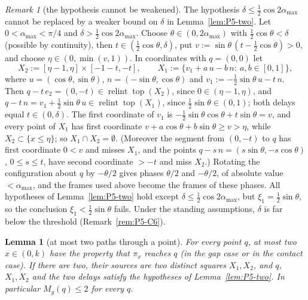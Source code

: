 \documentclass[11pt]{amsart}
\newcommand{\relint}{\operatorname{relint}}
\newcommand{\Top}{\operatorname{top}}
\newcommand{\amax}{\alpha_{\max}}
\newtheorem{lemma}[theorem]{Lemma}
\theoremstyle{definition}
\theoremstyle{remark}
\newtheorem{remark}[theorem]{Remark}
\numberwithin{equation}{section}
\begin{document}
\begin{remark}[the hypothesis cannot be weakened]\label{rem:P5-sharp}
The hypothesis $\delta\le\frac12\cos2\amax$ cannot be replaced by a weaker bound on $\delta$ in Lemma~\ref{lem:P5-two}. Let $0<\amax<\pi/4$ and $\delta>\frac12\cos2\amax$. Choose $\theta\in(0,2\amax)$ with $\frac12\cos\theta<\delta$ (possible by continuity), then $t\in(\frac12\cos\theta,\delta)$, put $v:=\sin\theta\,(t-\frac12\cos\theta)>0$, and choose $\eta\in(0,\min(v,1))$. In coordinates with $q=(0,0)$ let
\[
X_2:=[\eta-1,\eta]\times[-1-t,-t],\qquad X_1:=\{v_1+a\,u-b\,n:\ a,b\in[0,1]\},
\]
where $u=(\cos\theta,\sin\theta)$, $n=(-\sin\theta,\cos\theta)$ and $v_1:=-\frac12\sin\theta\,u-t\,n$. Then $q-t\,e_2=(0,-t)\in\relint\Top(X_2)$, since $0\in(\eta-1,\eta)$, and $q-t\,n=v_1+\frac12\sin\theta\,u\in\relint\Top(X_1)$, since $\frac12\sin\theta\in(0,1)$; both delays equal $t\in(0,\delta)$. The first coordinate of $v_1$ is $-\frac12\sin\theta\cos\theta+t\sin\theta=v$, and every point of $X_1$ has first coordinate $v+a\cos\theta+b\sin\theta\ge v>\eta$, while $X_2\subset\{x\le\eta\}$; so $X_1\cap X_2=\emptyset$. (Moreover the segment from $(0,-t)$ to $q$ has first coordinate $0<v$ and misses $X_1$, and the points $q-s\,n=(s\sin\theta,-s\cos\theta)$, $0\le s\le t$, have second coordinate $>-t$ and miss $X_2$.) Rotating the configuration about $q$ by $-\theta/2$ gives phases $\theta/2$ and $-\theta/2$, of absolute value $<\amax$, and the frames used above become the frames of these phases. All hypotheses of Lemma~\ref{lem:P5-two} hold except $\delta\le\frac12\cos2\amax$, but $\xi_1=\frac12\sin\theta$, so the conclusion $\xi_1<\frac12\sin\theta$ fails. Under the standing assumptions, $\delta$ is far below the threshold (Remark~\ref{rem:P5-C6}).
\end{remark}

\begin{lemma}[at most two paths through a point]\label{lem:P5-atmost2}
For every point $q$, at most two $x\in(0,k)$ have the property that $\pi_x$ reaches $q$ (in the gap case or in the contact case). If there are two, their sources are two distinct squares $X_1,X_2$, and $q$, $X_1,X_2$ and the two delays satisfy the hypotheses of Lemma~\ref{lem:P5-two}. In particular $M_g(q)\le2$ for every $q$.
\end{lemma}
\end{document}
